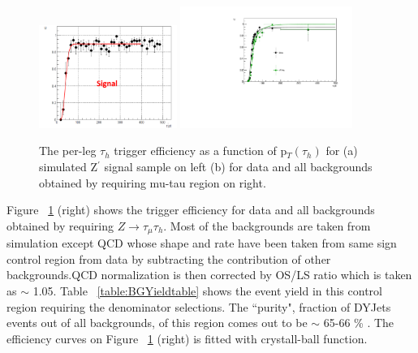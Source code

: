 \begin{figure}[tbh!]
  \centering
    \includegraphics[width=0.4\textwidth]{TriggerEff_Signal.pdf}
    \includegraphics[width=0.5\textwidth]{CrystalBall.pdf}
  \caption{The per-leg $\tau_{h}$ trigger efficiency as a function of p$_{T}(\tau_{h})$ for (a) simulated Z$^{\prime}$ signal sample on left (b) for data and all backgrounds obtained by requiring mu-tau region on right.}
  \label{fig:trigger}
\end{figure}

Figure ~\ref{fig:trigger} (right) shows the trigger efficiency for data and all backgrounds obtained by requiring $Z\to\tau_{\mu} \tau_{h}$. Most of the backgrounds are taken from simulation except QCD whose shape and rate have been taken from same sign control region from data by subtracting the contribution of other backgrounds.QCD normalization is  then corrected by OS/LS ratio which is taken as $\sim$ 1.05. Table ~\ref{table:BGYieldtable} shows the event yield in this control region requiring the denominator selections. The ``purity", fraction of DYJets events out of all backgrounds, of this region comes out to be $\sim$ 65-66 \% . The efficiency curves on Figure ~\ref{fig:trigger} (right) is fitted with crystall-ball function.

\begin{table}[!htpb]
   \caption{Event rate in mu-tau control region after requiring denominator level selections }
   \label{table:BGYieldtable} %
 \end{table}

